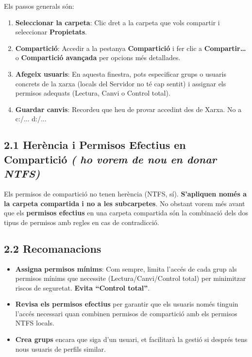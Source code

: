 \documentclass[
  a4paper,
]{article}
\begin{document}
Els passos generals són:

\begin{enumerate}
\def\labelenumi{\arabic{enumi}.}
\item
  \textbf{Seleccionar la carpeta}: Clic dret a la carpeta que vols
  compartir i seleccionar \textbf{Propietats}.
\item
  \textbf{Compartició}: Accedir a la pestanya \textbf{Compartició} i fer
  clic a \textbf{Compartir\ldots{}} o \textbf{Compartició avançada} per
  opcions més detallades.
\item
  \textbf{Afegeix usuaris}: En aquesta finestra, pots especificar grups
  o usuaris concrets de la xarxa (locals del Servidor no té cap sentit)
  i assignar els permisos adequats (Lectura, Canvi o Control total).
\item
  \textbf{Guardar canvis}: Recordeu que heu de provar accedint des de
  Xarxa. No a c:/... d:/...
\end{enumerate}

\subsection{\texorpdfstring{2.1 Herència i Permisos Efectius en
Compartició \emph{( ho vorem de nou en donar
NTFS)}}{2.1 Herència i Permisos Efectius en Compartició ( ho vorem de nou en donar NTFS)}}\label{heruxe8ncia-i-permisos-efectius-en-comparticiuxf3-ho-vorem-de-nou-en-donar-ntfs}

Els permisos de compartició no tenen herència (NTFS, sí).
\textbf{S'apliquen només a la carpeta compartida i no a les
subcarpetes}. No obstant vorem més avant que els \textbf{permisos
efectius} en una carpeta compartida són la combinació dels dos tipus de
permisos amb regles en cas de contradicció.

\subsection{2.2 Recomanacions}\label{recomanacions}

\begin{itemize}
\item
  \textbf{Assigna permisos mínims}: Com sempre, limita l'accés de cada
  grup als permisos mínims que necessite (Lectura/Canvi/Control total)
  per minimitzar riscos de seguretat. \textbf{Evita ``Control total''}.
\item
  \textbf{Revisa els permisos efectius} per garantir que els usuaris
  només tinguin l'accés necessari quan combinen permisos de compartició
  amb els permisos NTFS locals.
\item
  \textbf{Crea grups} encara que siga d'un usuari, et facilitarà la
  gestió si després tens nous usuaris de perfils similar.
\end{itemize}
\end{document}
